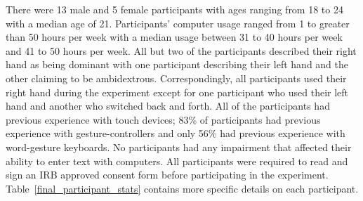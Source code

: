 There were 13 male and 5 female participants with ages ranging from 18 to 24 with a median age of 21. Participants' computer usage ranged from 1 to greater than 50 hours per week with a median usage between 31 to 40 hours per week and 41 to 50 hours per week. All but two of the participants described their right hand as being dominant with one participant describing their left hand and the other claiming to be ambidextrous. Correspondingly, all participants used their right hand during the experiment except for one participant who used their left hand and another who switched back and forth. All of the participants had previous experience with touch devices; 83\% of participants had previous experience with gesture-controllers and only 56\% had previous experience with word-gesture keyboards. No participants had any impairment that affected their ability to enter text with computers. All participants were required to read and sign an IRB approved consent form before participating in the experiment. Table~\ref{final_participant_stats} contains more specific details on each participant.

